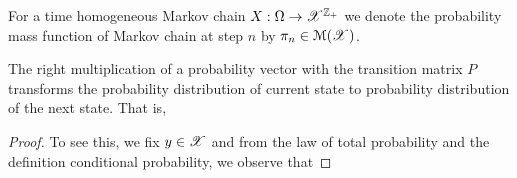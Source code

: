 \documentclass[letterpaper,10pt,english]{article}
\begin{document}
\begin{defn}
For a time homogeneous Markov chain $X:\Omega\to\mathscr{X}^{\mathbb{Z}_+}$ we denote the probability mass function of Markov chain at step $n$ by $\pi_n\in \mathcal{M}(\mathscr{X})$. 
\end{defn}
\begin{lem}
The right multiplication of a probability vector with the transition matrix $P$ transforms the probability distribution of current state to probability distribution of the next state. 
That is, 
\end{lem}
\begin{proof}
To see this, we fix $y \in \mathscr{X}$ and from the law of total probability and the definition conditional probability, we observe that 
\end{proof}
\end{document}
